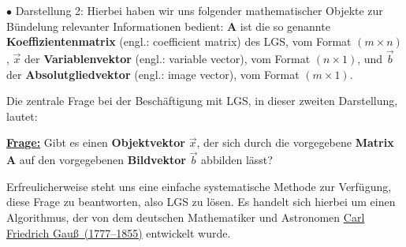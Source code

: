 \medskip
\noindent
$\bullet$ Darstellung 2:
%
\be
{}
\ee
%
Hierbei haben wir uns folgender mathematischer Objekte
zur B\"undelung relevanter Informationen bedient: $\mathbf{A}$
ist die so genannte {\bf Koeffizientenmatrix} (engl.: coefficient 
matrix) des LGS, vom Format $(m \times n)$, $\vec{x}$ der {\bf 
Variablenvektor} (engl.: variable vector), vom Format $(n \times 
1)$, und $\vec{b}$ der {\bf Absolutgliedvektor} (engl.: image 
vector), vom Format $(m \times 1)$.

\medskip
\noindent
Die zentrale Frage bei der Besch\"aftigung mit LGS,
in dieser zweiten Darstellung, lautet:

\medskip
\noindent
\underline{\bf Frage:}
Gibt es einen {\bf Objektvektor} $\vec{x}$, der sich durch die
vorgegebene {\bf Matrix} $\mathbf{A}$ auf den vorgegebenen
{\bf Bildvektor} $\vec{b}$ abbilden l\"asst?

\medskip
\noindent
Erfreulicherweise steht uns eine einfache systematische Methode
zur Verf\"ugung, diese Frage zu beantworten, also LGS zu l\"osen.
Es handelt sich hierbei um einen Algorithmus, der von dem
deutschen Mathematiker und Astronomen
\href{http://www-groups.dcs.st-and.ac.uk/~history/Biographies/Gauss.html}{Carl
Friedrich Gau\ss\ (1777--1855)} entwickelt wurde.

